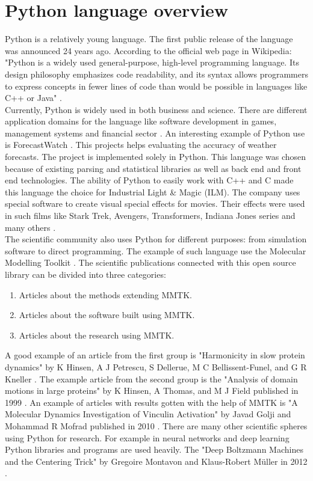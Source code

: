 \documentclass[
  twoside,
  11pt, a4paper,
  footinclude=true,
  headinclude=true,
  cleardoublepage=empty
]{scrreprt}
\begin{document}
        \section{Python language overview}
        Python is a relatively young language. The first public release of the language was announced 24 years ago. According to the official web page in Wikipedia: "Python is a widely used general-purpose, high-level programming language. Its design philosophy emphasizes code readability, and its syntax allows programmers to express concepts in fewer lines of code than would be possible in languages like C++ or Java" \cite{wiki:Pyhton}.\\
        Currently, Python is widely used in both business and science. There are different application domains for the language like software development in games, management systems and financial sector \cite{python:Example0}. An interesting example of Python use is ForecastWatch \cite{python:Example1}. This projects helps evaluating the accuracy of weather forecasts. The project is implemented solely in Python. This language was chosen because of existing parsing and statistical libraries as well as back end and front end technologies. The ability of Python to easily work with C++ and C made this language the choice for Industrial Light \& Magic (ILM). The company uses special software to create visual special effects for movies. Their effects were used in such films like Stark Trek, Avengers, Transformers, Indiana Jones series and many others \cite{python:Example7}.\\
        The scientific community also uses Python for different purposes: from simulation software to direct programming. The example of such language use the Molecular Modelling Toolkit \cite{python:Example2}. The scientific publications connected with this open source library can be divided into three categories:
        \begin{enumerate}
            \item Articles about the methods extending MMTK.
            \item Articles about the software built using MMTK.
            \item Articles about the research using MMTK.
        \end{enumerate}
        A good example of an article from the first group is "Harmonicity in slow protein dynamics" by K Hinsen, A J Petrescu, S Dellerue, M C Bellissent-Funel, and G R Kneller \cite{python:Example3}. The example article from the second group is the "Analysis of domain motions in large proteins" by K Hinsen, A Thomas, and M J Field published in 1999 \cite{python:Example4}. An example of articles with results gotten with the help of MMTK is "A Molecular Dynamics Investigation of Vinculin Activation" by Javad Golji and Mohammad R Mofrad published in 2010 \cite{python:Example5}. There are many other scientific spheres using Python for research. For example in neural networks and deep learning Python libraries and programs are used heavily. The "Deep Boltzmann Machines and the Centering Trick" by Gregoire Montavon and Klaus-Robert Müller in 2012 \cite{python:Example6}.\\
\end{document}

